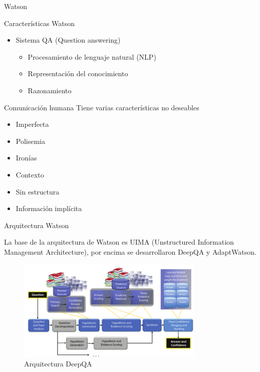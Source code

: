 \documentclass[compress]{beamer}
\begin{document}
\begin{frame}{Watson}
	\begin{block}{Características Watson}
		\begin{itemize}
			\item Sistema QA (Question answering)
			\begin{itemize}
				\item Procesamiento
				de lenguaje natural (NLP)	
				\item Representación del conocimiento
				\item Razonamiento
			\end{itemize}
		\end{itemize}
	\end{block}
	\begin{block}{Comunicación humana}
		Tiene varias características no deseables
		\begin{itemize}
			\item Imperfecta
			\item Polisemia
			\item Ironías
			\item Contexto
			\item Sin estructura
			\item Información implícita
		\end{itemize}
	\end{block}
\end{frame}

\begin{frame}{Arquitectura Watson}
	\begin{block}{ }
		La base de la arquitectura de Watson es UIMA (Unstructured Information Management Architecture), por encima se desarrollaron DeepQA y AdaptWatson.
	\end{block}
	\begin{figure}[H]
		\centering
		\label{tiw-deepqa}
		\includegraphics[width=0.8\textwidth]{./Imagenes/deepQA.png}
		\caption{Arquitectura DeepQA}
	\end{figure}
\end{frame}
\end{document}
